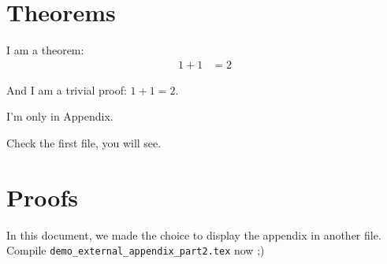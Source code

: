 \documentclass{article}
\begin{document}
\section{Theorems}\label{sec:theorems}

\begin{thmE}
  I am a theorem:
  \begin{align}
    1+1 &= 2 \label{eq:nontrivialfact}
  \end{align}
\end{thmE}
\begin{proofE}
  And I am a trivial proof: $1+1=2$.
\end{proofE}

\begin{thmE}
  I'm only in Appendix.
\end{thmE}
\begin{proofE}
  Check the first file, you will see.
\end{proofE}

\section{Proofs}

In this document, we made the choice to display the appendix in another file.  Compile \verb|demo_external_appendix_part2.tex| now ;)
\end{document}
